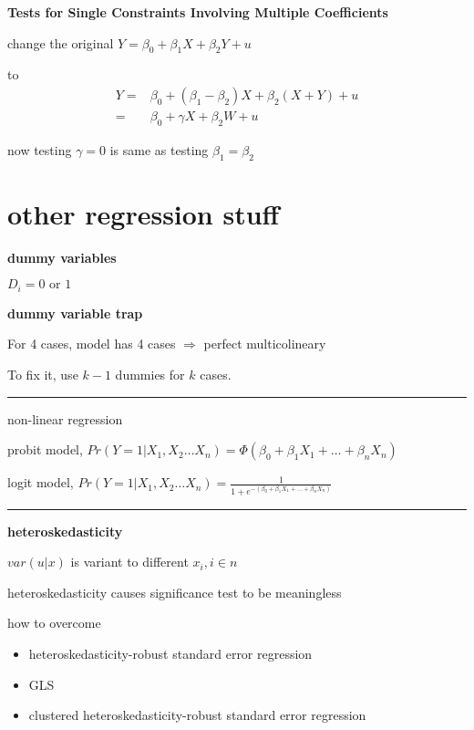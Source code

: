 \documentclass{article}
\providecommand{\tightlist}{
  \setlength{\itemsep}{0pt}
  \setlength{\parskip}{0pt}}
\newcommand*\sepline{%
  \begin{center}
    \rule[1ex]{.5\textwidth}{.5pt}
  \end{center}}
\begin{document}
\textbf{Tests for Single Constraints Involving Multiple Coefficients}

change the original
$Y=\beta_{0}+\beta_{1}X+\beta_{2}Y+u$ 

to
\begin{equation}
\begin{split}
  Y=&\beta_{0}+(\beta_1- \beta_{2})X+\beta_2 (X+Y)+u\\
  =&\beta_{0}+\gamma X +\beta_2 W+u
\end{split}
\end{equation}

now testing $\gamma=0$ is same as testing $\beta_{1}=\beta_{2}$




\section{other regression stuff}

\textbf{dummy variables}

$D_i=0 \text{ or } 1$

\textbf{dummy variable trap}

For 4 cases, model has 4 cases $\Rightarrow$ perfect multicolineary

To fix it, use $k-1$ dummies for $k$ cases.

\sepline

non-linear regression

probit model, $Pr(Y=1|X_1,X_2\dots X_n)=\Phi(\beta_0 +\beta_{1}X_1+\dots+\beta_{n} X_n)$

logit model, $Pr(Y=1|X_1,X_2\dots X_n)=\frac{1}{1+e^{-(\beta_0 +\beta_{1}X_1+\dots+\beta_{n} X_n)}}$


\sepline

\textbf{heteroskedasticity}

$var(u|x)$ is variant to different $x_i, i\in n$

heteroskedasticity causes significance test to be meaningless

how to overcome

\begin{itemize}
\tightlist
  \item heteroskedasticity-robust standard error regression
  \item GLS
  \item clustered heteroskedasticity-robust standard error regression
\end{itemize}
\end{document}
